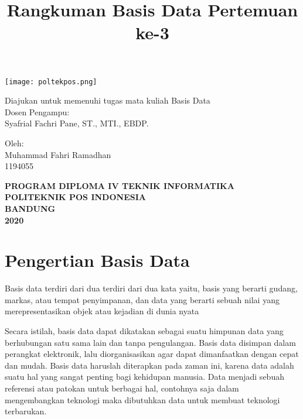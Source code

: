 \documentclass[a4paper,12pt] {article}
\title{Rangkuman Basis Data Pertemuan ke-3}
\author{}
\date{}
\begin{document}
\begin{titlepage}
\maketitle
\thispagestyle{empty}

\vspace{0.5cm}
\begin{center}
\texttt{[image: poltekpos.png]}
\end{center}
\vspace{0.5cm}
\begin{center}
Diajukan untuk memenuhi tugas mata kuliah Basis Data\\
\vspace{12px}
Dosen Pengampu:\\
Syafrial Fachri Pane, ST., MTI., EBDP.
\vspace{12px}

Oleh:\\
Muhammad Fahri Ramadhan\\
1194055
\vspace{14px}

\textbf{PROGRAM DIPLOMA IV TEKNIK INFORMATIKA}\\
\textbf{POLITEKNIK POS INDONESIA\\}\textbf{BANDUNG}\\
\textbf{2020}
\end{center}
\end{titlepage}


\newpage

\maketitle


\section{Pengertian Basis Data}
 Basis data terdiri dari dua terdiri dari dua kata yaitu, basis yang berarti gudang, markas, atau tempat penyimpanan, dan data yang berarti sebuah nilai yang merepresentasikan objek atau kejadian di dunia nyata
\par Secara istilah, basis data dapat dikatakan sebagai suatu himpunan data yang berhubungan satu sama lain dan tanpa pengulangan. Basis data disimpan dalam perangkat elektronik, lalu diorganisasikan agar dapat dimanfaatkan dengan cepat dan mudah.
Basis data haruslah diterapkan pada zaman ini, karena data adalah suatu hal yang sangat penting bagi kehidupan manusia. Data menjadi sebuah referensi atau patokan untuk berbagai hal, contohnya saja dalam mengembangkan teknologi maka dibutuhkan data untuk membuat teknologi terbarukan.
\end{document}

